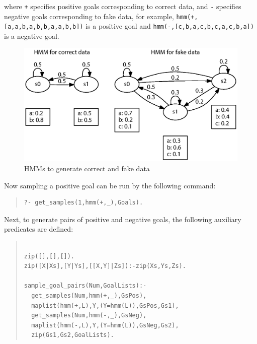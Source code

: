 \documentclass[a4paper]{report}
\makeatletter
\let\tts@ve\tt
\def\tt{\tts@ve\ifmmode\def\_{\mathchar`\_}\else\def\_{\char`\_}\fi}
\makeatother
\begin{document}
where {\tt +} specifies positive goals corresponding to correct data, and {\tt -} specifies negative goals corresponding to fake data, for example, {\tt hmm(+,[a,a,b,a,b,b,a,a,b,b])} is a positive goal and {\tt hmm(-,[c,b,a,c,b,c,a,c,b,a])} is a negative goal. 
\begin{figure}[t]
	\begin{center}
	\centerline{\includegraphics[width=0.9\hsize]{fig/rank_hmm01.eps}}
	\caption{HMMs to generate correct and fake data}
	\label{fig:rank_hmm_ex}
	\end{center}
\end{figure}

Now sampling a positive goal can be run by the following command:

\begin{quote}
\begin{small}
\begin{verbatim}
?- get_samples(1,hmm(+,_),Goals).
\end{verbatim}
\end{small}
\end{quote}

Next, to generate pairs of positive and negative goals, the following auxiliary predicates are defined:

\begin{quote}
\begin{small}
\begin{verbatim}

zip([],[],[]).
zip([X|Xs],[Y|Ys],[[X,Y]|Zs]):-zip(Xs,Ys,Zs).

sample_goal_pairs(Num,GoalLists):-
  get_samples(Num,hmm(+,_),GsPos),
  maplist(hmm(+,L),Y,(Y=hmm(L)),GsPos,Gs1),
  get_samples(Num,hmm(-,_),GsNeg),
  maplist(hmm(-,L),Y,(Y=hmm(L)),GsNeg,Gs2),
  zip(Gs1,Gs2,GoalLists).
\end{verbatim}
\end{small}
\end{quote}
\end{document}
